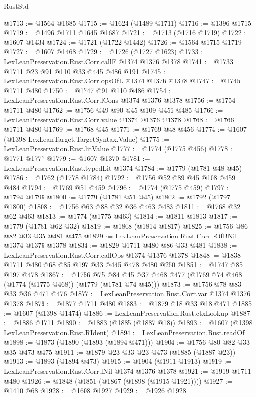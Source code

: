 \begin{lexlean}{RustStd}
\begin{coremodule}
@1713 := @1564 @1685
@1715 := @1624 (@1489 @1711)
@1716 := @1396 @1715
@1719 := @1496 @1711 @1645 @1687
@1721 := @1713 (@1716 @1719)
@1722 := @1607 @1434
@1724 := @1721 (@1722 @1442)
@1726 := @1564 @1715 @1719
@1727 := @1607 @1468
@1729 := @1726 (@1727 @1623)
@1733 := LexLeanPreservation.Rust.Corr.callF @1374 @1376 @1378
@1741 := @1733 @1711 @23 @91 @110 @33 @445 @486 @191
@1745 := LexLeanPreservation.Rust.Corr.opsOfL @1374 @1376 @1378
@1747 := @1745 @1711 @480
@1750 := @1747 @91 @110 @486
@1754 := LexLeanPreservation.Rust.Corr.lCons @1374 @1376 @1378
@1756 := @1754 @1711 @480
@1762 := @1756 @49 @90 @45 @109 @456 @485
@1766 := LexLeanPreservation.Rust.Corr.value @1374 @1376 @1378
@1768 := @1766 @1711 @480
@1769 := @1768 @45
@1771 := @1769 @48 @456
@1774 := @1607 (@1398 LexLeanTarget.TargetSyntax.Value)
@1775 := LexLeanPreservation.Rust.litValue
@1777 := @1774 (@1775 @456)
@1778 := @1771 @1777
@1779 := @1607 @1370
@1781 := LexLeanPreservation.Rust.typedLit @1374
@1784 := @1779 (@1781 @48 @45)
@1786 := @1762 (@1778 @1784)
@1792 := @1756 @52 @89 @45 @108 @459 @484
@1794 := @1769 @51 @459
@1796 := @1774 (@1775 @459)
@1797 := @1794 @1796
@1800 := @1779 (@1781 @51 @45)
@1802 := @1792 (@1797 @1800)
@1808 := @1756 @63 @88 @32 @36 @463 @483
@1811 := @1768 @32 @62 @463
@1813 := @1774 (@1775 @463)
@1814 := @1811 @1813
@1817 := @1779 (@1781 @62 @32)
@1819 := @1808 (@1814 @1817)
@1825 := @1756 @86 @82 @33 @35 @481 @475
@1829 := LexLeanPreservation.Rust.Corr.eOfBNil @1374 @1376 @1378
@1834 := @1829 @1711 @480 @86 @33 @481
@1838 := LexLeanPreservation.Rust.Corr.callOps @1374 @1376 @1378
@1848 := @1838 @1711 @480 @68 @85 @197 @33 @445 @478 @480 @250
@1851 := @1747 @85 @197 @478
@1867 := @1756
    @75
    @84
    @45
    @37
    @468
    @477
    (@1769 @74 @468 (@1774 (@1775 @468)) (@1779 (@1781 @74 @45)))
@1873 := @1756 @78 @83 @33 @36 @471 @476
@1877 := LexLeanPreservation.Rust.Corr.var @1374 @1376 @1378
@1879 := @1877 @1711 @480
@1883 := @1879 @18 @33 @18 @471
@1885 := @1607 (@1398 @1474)
@1886 := LexLeanPreservation.Rust.ctxLookup
@1887 := @1886 @1711
@1890 := @1883 (@1885 (@1887 @18))
@1893 := @1607 (@1398 LexLeanPreservation.Rust.RIdent)
@1894 := LexLeanPreservation.Rust.readOf
@1898 := @1873 (@1890 (@1893 (@1894 @471)))
@1904 := @1756 @80 @82 @33 @35 @473 @475
@1911 := @1879 @23 @33 @23 @473 (@1885 (@1887 @23))
@1913 := @1893 (@1894 @473)
@1915 := @1904 (@1911 @1913)
@1919 := LexLeanPreservation.Rust.Corr.lNil @1374 @1376 @1378
@1921 := @1919 @1711 @480
@1926 := @1848 (@1851 (@1867 (@1898 (@1915 @1921))))
@1927 := @1410 @68
@1928 := @1608 @1927
@1929 := @1926 @1928

\end{coremodule}
\end{lexlean}
